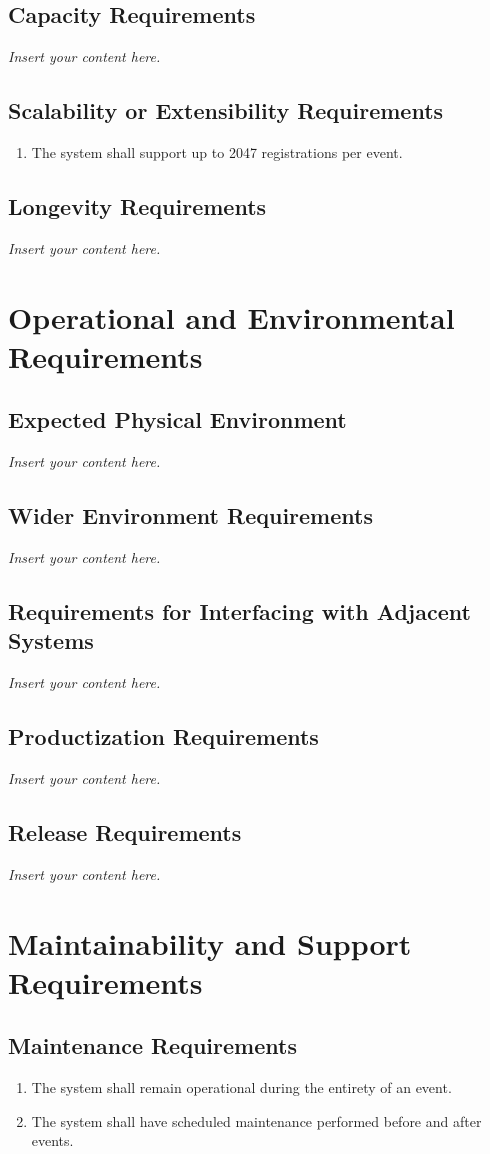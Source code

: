 \documentclass[12pt]{article}
\newcommand{\lips}{\textit{Insert your content here.}}
\begin{document}
\subsection{Capacity Requirements}
\lips
\subsection{Scalability or Extensibility Requirements}
\begin{enumerate}[align=left,
  leftmargin=*,
  labelsep=1em,
  itemindent=0em,
  label=\bfseries SE-\arabic*:]
  \item The system shall support up to 2047 registrations per event.
\end{enumerate}
\subsection{Longevity Requirements}
\lips

\section{Operational and Environmental Requirements}
\subsection{Expected Physical Environment}
\lips
\subsection{Wider Environment Requirements}
\lips
\subsection{Requirements for Interfacing with Adjacent Systems}
\lips
\subsection{Productization Requirements}
\lips
\subsection{Release Requirements}
\lips

\section{Maintainability and Support Requirements}
\subsection{Maintenance Requirements}
\begin{enumerate}[align=left,
  leftmargin=*,
  labelsep=1em,
  itemindent=0em,
  label=\bfseries MT-\arabic*:]
  \item The system shall remain operational during the entirety of an event.
  \item The system shall have scheduled maintenance performed before and after events.
\end{enumerate}
\end{document}
